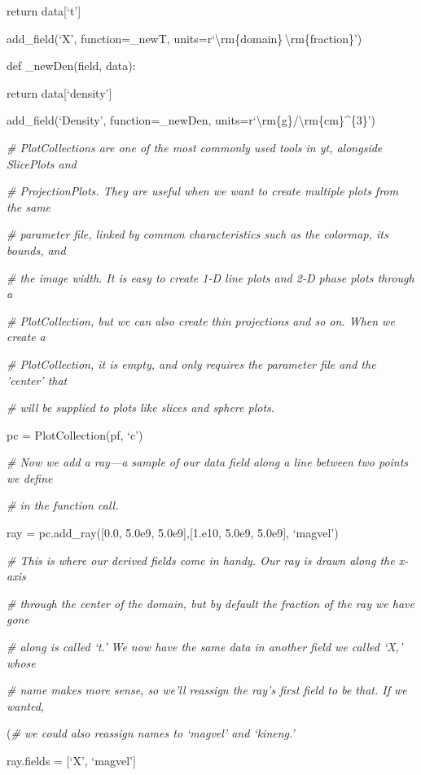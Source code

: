 {\setlength{\parindent}{18.5pt}return data[`t']}

add\_field(`X', function=\_newT, units=r`\textbackslash rm\{domain\}\,\textbackslash rm\{fraction\}')

def \_newDen(field, data):

{\setlength{\parindent}{18.5pt}return data[`density']}

add\_field(`Density', function=\_newDen, units=r`\textbackslash rm\{g\}/\textbackslash rm\{cm\}\^{}\{3\}')

{\it\# PlotCollections are one of the most commonly used tools in yt, alongside SlicePlots and}
{\setlength{\parskip}{0pt}

{\it\# ProjectionPlots. They are useful when we want to create multiple plots from the same}

{\it\# parameter file, linked by common characteristics such as the colormap, its bounds, and}

{\it\# the image width. It is easy to create 1-D line plots and 2-D phase plots through a}

{\it\# PlotCollection, but we can also create thin projections and so on. When we create a}

{\it\# PlotCollection, it is empty, and only requires the parameter file and the 'center' that}

{\it\# will be supplied to plots like slices and sphere plots.}

pc = PlotCollection(pf, `c')
}

{\it\# Now we add a ray---a sample of our data field along a line between two points we define}
{\setlength{\parskip}{0pt}

{\it\# in the function call.}

ray = pc.add\_ray([0.0, 5.0e9, 5.0e9],[1.e10, 5.0e9, 5.0e9], `magvel')
}

{\it\# This is where our derived fields come in handy. Our ray is drawn along the x-axis}
{\setlength{\parskip}{0pt}

{\it\# through the center of the domain, but by default the fraction of the ray we have gone}

{\it\# along is called `t.' We now have the same data in another field we called `X,' whose}

{\it\# name makes more sense, so we'll reassign the ray's first field to be that. If we wanted,}

(\it\# we could also reassign names to `magvel' and `kineng.'

ray.fields = [`X', `magvel']
}

